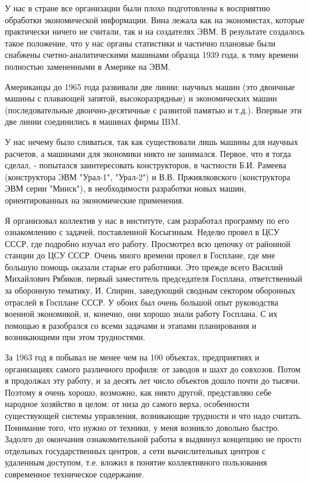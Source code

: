 \documentclass{article}
\begin{document}
У нас в стране все организации были плохо подготовлены к восприятию обработки
экономической информации. Вина лежала как на экономистах, которые практически
ничего не считали, так и на создателях ЭВМ. В результате создалось такое
положение, что у нас органы статистики и частично плановые были снабжены
счетно-аналитическими машинами образца 1939 года, к тому времени полностью
замененными в Америке на ЭВМ.

Американцы до 1965 года развивали две линии: научных машин (это двоичные машины
с плавающей запятой, высокоразрядные) и экономических машин (последовательные
двоично-десятичные с развитой памятью и т.д.). Впервые эти две линии соединились
в машинах фирмы IBM.

У нас нечему было сливаться, так как существовали лишь машины для научных
расчетов, а машинами для экономики никто не занимался. Первое, что я тогда
сделал, - попытался заинтересовать конструкторов, в частности Б.И. Рамеева
(конструктора ЭВМ "Урал-1", "Урал-2") и В.В. Пржиялковского (конструктора ЭВМ
серии "Минск"), в необходимости разработки новых машин, ориентированных на
экономические применения.

Я организовал коллектив у нас в институте, сам разработал программу по его
ознакомлению с задачей, поставленной Косыгиным. Неделю провел в ЦСУ СССР, где
подробно изучал его работу. Просмотрел всю цепочку от районной станции до ЦСУ
СССР. Очень много времени провел в Госплане, где мне большую помощь оказали
старые его работники. Это прежде всего Василий Михайлович Рябиков, первый
заместитель председателя Госплана, ответственный за оборонную тематику, И.
Спирин, заведующий сводным сектором оборонных отраслей в Госплане СССР. У обоих
был очень большой опыт руководства военной экономикой, и, конечно, они хорошо
знали работу Госплана. С их помощью я разобрался со всеми задачами и этапами
планирования и возникающими при этом трудностями.

За 1963 год я побывал не менее чем на 100 объектах, предприятиях и организациях
самого различного профиля: от заводов и шахт до совхозов. Потом я продолжал эту
работу, и за десять лет число объектов дошло почти до тысячи. Поэтому я очень
хорошо, возможно, как никто другой, представляю себе народное хозяйство в целом:
от низа до самого верха, особенности существующей системы управления,
возникающие трудности и что надо считать. Понимание того, что нужно от техники,
у меня возникло довольно быстро. Задолго до окончания ознакомительной работы я
выдвинул концепцию не просто отдельных государственных центров, а сети
вычислительных центров с удаленным доступом, т.е. вложил в понятие коллективного
пользования современное техническое содержание.
\end{document}

